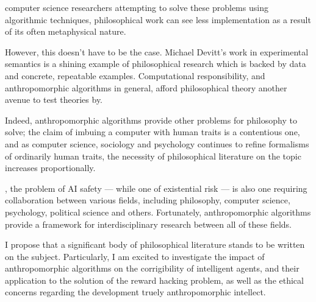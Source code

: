  computer science researchers attempting to solve these problems using algorithmic techniques, philosophical work can see less implementation as a result of its often metaphysical nature.\par

However, this doesn't have to be the case. Michael Devitt's work in experimental semantics\cite{experimental_semantics} is a shining example of philosophical research which is backed by data and concrete, repeatable examples. Computational responsibility, and anthropomorphic algorithms in general, afford philosophical theory another avenue to test theories by.\par

Indeed, anthropomorphic algorithms provide other problems for philosophy to solve; the claim of imbuing a computer with human traits is a contentious one, and as computer science, sociology and psychology continues to refine formalisms of ordinarily human traits, the necessity of philosophical literature on the topic increases proportionally.\par
, the problem of AI safety --- while one of existential risk --- is also one requiring collaboration between various fields, including philosophy, computer science, psychology, political science and others. Fortunately, anthropomorphic algorithms provide a framework for interdisciplinary research between all of these fields.\par

I propose that a significant body of philosophical literature stands to be written on the subject. Particularly, I am excited to investigate the impact of anthropomorphic algorithms on the corrigibility of intelligent agents, and their application to the solution of the reward hacking problem, as well as the ethical concerns regarding the development truely anthropomorphic intellect.

